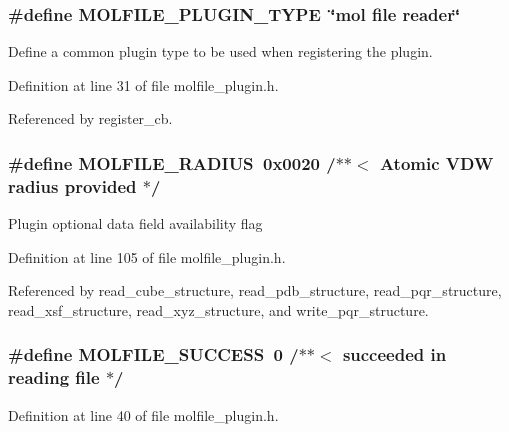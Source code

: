 \subsubsection{\setlength{\rightskip}{0pt plus 5cm}\#define MOLFILE\_\-PLUGIN\_\-TYPE\ \char`\"{}mol file reader\char`\"{}}\label{molfile__plugin_8h_a0}


Define a common plugin type to be used when registering the plugin. 

Definition at line 31 of file molfile\_\-plugin.h.

Referenced by register\_\-cb.
\subsubsection{\setlength{\rightskip}{0pt plus 5cm}\#define MOLFILE\_\-RADIUS\ 0x0020 /$\ast$$\ast$$<$ Atomic VDW radius provided       $\ast$/}\label{molfile__plugin_8h_a14}


Plugin optional data field availability flag 

Definition at line 105 of file molfile\_\-plugin.h.

Referenced by read\_\-cube\_\-structure, read\_\-pdb\_\-structure, read\_\-pqr\_\-structure, read\_\-xsf\_\-structure, read\_\-xyz\_\-structure, and write\_\-pqr\_\-structure.
\subsubsection{\setlength{\rightskip}{0pt plus 5cm}\#define MOLFILE\_\-SUCCESS\ 0   /$\ast$$\ast$$<$ succeeded in reading file      $\ast$/}\label{molfile__plugin_8h_a2}




Definition at line 40 of file molfile\_\-plugin.h.


